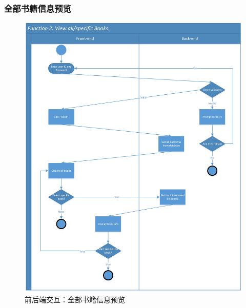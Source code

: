 \documentclass[twoside,11pt]{article}
\begin{document}
\subsubsection{全部书籍信息预览}
\begin{figure}[H]
    \centering
    \includegraphics[width=0.9\columnwidth]{SwimLaneDiagram/Usecase_2.jpg}
    \caption{前后端交互：全部书籍信息预览}
    \label{fig:bookinfo}
\end{figure}
\newpage
\end{document}
